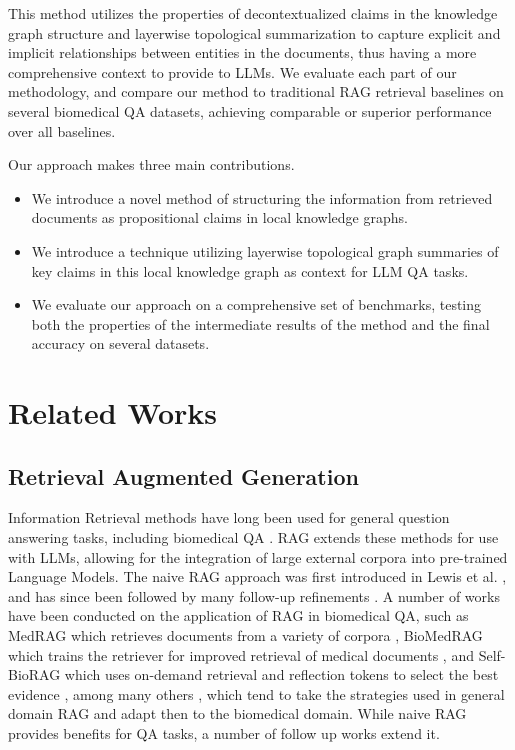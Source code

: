 \documentclass[11pt]{article}
\theoremstyle{definition}
\begin{document}
This method utilizes the properties of decontextualized claims in the knowledge graph structure and layerwise topological summarization to capture explicit and implicit relationships between entities in the documents, thus having a more comprehensive context to provide to LLMs. We evaluate each part of our methodology, and compare our method to traditional RAG retrieval baselines on several biomedical QA datasets, achieving comparable or superior performance over all baselines.

Our approach makes three main contributions.
\begin{itemize}%
    \item We introduce a novel method of structuring the information from retrieved documents as propositional claims in local knowledge graphs.
    \item We introduce a technique utilizing layerwise topological graph summaries of key claims in this local knowledge graph as context for LLM QA tasks.
    \item We evaluate our approach on a comprehensive set of benchmarks, testing both the properties of the intermediate results of the method and the final accuracy on several datasets.
\end{itemize}

\section{Related Works}

\subsection{Retrieval Augmented Generation}
Information Retrieval methods have long been used for general question answering tasks, including biomedical QA \cite{10.1145/3490238}. RAG extends these methods for use with LLMs, allowing for the integration of large external corpora into pre-trained Language Models. The naive RAG approach was first introduced in Lewis et al. \cite{DBLP:conf/nips/LewisPPPKGKLYR020}, and has since been followed by many follow-up refinements \cite{DBLP:journals/corr/abs-2312-10997}. A number of works have been conducted on the application of RAG in biomedical QA, such as MedRAG which retrieves documents from a variety of corpora \cite{DBLP:conf/acl/Xiong0LZ24}, BioMedRAG which trains the retriever for improved retrieval of medical documents \cite{li2024biomedrag}, and Self-BioRAG which uses on-demand retrieval and reflection tokens to select the best evidence \cite{pmlr-v225-yu23b}, among many others \cite{Liu2024ASO, Zhou2023ASO}, which tend to take the strategies used in general domain RAG and adapt then to the biomedical domain. While naive RAG provides benefits for QA tasks, a number of follow up works extend it. 
\end{document}
